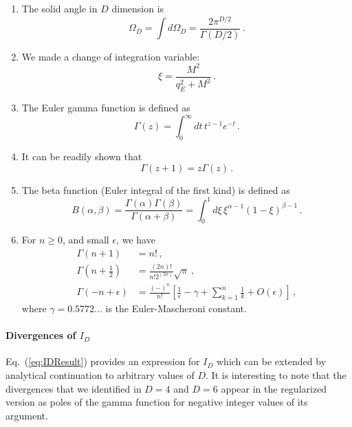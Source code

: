 \begin{enumerate}
\item The solid angle in $D$ dimension is
  \begin{equation}
    \label{eq:SoliAngleDDim}
    \Omega_D = \int d\Omega_D =
    \frac{2\pi^{D/2}}{\Gamma(D/2)}\, .
  \end{equation}
\item We made a change of integration variable:
  \begin{equation}
    \label{eq:IntegVarChange}
    \xi = \frac{M^2}{q_E^2+M^2}\, .
  \end{equation}
\item The Euler gamma function is defined as
  \begin{equation}
    \label{eq:GammaFunDef}
    \Gamma(z) = \int_0^\infty dt\, t^{z-1} e^{-t}\, .
  \end{equation}
\item It can be readily shown that
  \begin{equation}
    \label{eq:GammRec}
    \Gamma(z+1) = z \Gamma(z)\, .
  \end{equation}
\item The beta function (Euler integral of the first kind) is defined
  as
  \begin{equation}
    \label{eq:BetaFunDef}
    B(\alpha,\beta) = \frac{\Gamma(\alpha)
      \Gamma(\beta)}{\Gamma(\alpha+\beta)} =
    \int_0^1 d\xi\, \xi^{\alpha-1} \left(1-\xi\right)^{\beta-1}\, .
  \end{equation}
\item For $n\geq 0$, and small $\epsilon$, we have
  \begin{align}
    \Gamma(n+1) &= n! \, , \\
    \Gamma\left(n+\frac12\right) &= \frac{(2n)!}{n!2^{(2n)}}
                                   \sqrt{\pi}\, , \\
    \Gamma(-n+\epsilon) &= \frac{(-)^n}{n!} \left[
                          \frac{1}{\epsilon} - \gamma + \sum_{k=1}^n
                          \frac{1}{k} + O(\epsilon)
                          \right]\, ,
  \end{align}
  where $\gamma=0.5772...$ is the Euler-Mascheroni constant. 
\end{enumerate}

\paragraph{Divergences of $I_D$}

Eq.~(\ref{eq:IDResult}) provides an expression for $I_D$ which can be
extended by analytical continuation to arbitrary values of $D$. It is
interesting to note that the divergences that we identified in $D=4$
and $D=6$ appear in the regularized version as poles of the gamma
function for negative integer values of its argument. 

